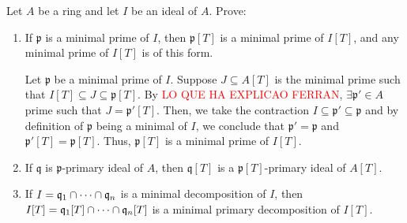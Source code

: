 \begin{problem}
    Let $A$ be a ring and let $I$ be an ideal of $A$.
    Prove:
    \begin{enumerate}[label=(\theproblem.\arabic*),ref=\theproblem.\arabic*]

        \item If $\mathfrak{p}$ is a minimal prime of $I$, then $\mathfrak{p}[T]$ is a minimal prime of $I[T]$, and any minimal prime of $I[T]$ is of this form.
        \begin{sol}
            Let $\mathfrak{p}$ be a minimal prime of $I$.
            Suppose $J \subseteq A[T]$ is the minimal prime such that $I[T] \subseteq J \subseteq \mathfrak{p}[T]$.
            By \textcolor{red}{LO QUE HA EXPLICAO FERRAN}, $\exists \mathfrak{p}' \in A$ prime such that $J = \mathfrak{p}'[T]$.
            Then, we take the contraction $I \subseteq \mathfrak{p}' \subseteq \mathfrak{p}$ and by definition of $\mathfrak{p}$ being a minimal of $I$, we conclude that $\mathfrak{p}' = \mathfrak{p}$ and $\mathfrak{p}'[T] = \mathfrak{p}[T]$.
            Thus, $\mathfrak{p}[T]$ is a minimal prime of $I[T]$.
        \end{sol}

        \item If $\mathfrak{q}$ is $\mathfrak{p}$-primary ideal of $A$, then $\mathfrak{q}[T]$ is a $\mathfrak{p}[T]$-primary ideal of $A[T]$.
        \begin{sol}
        \end{sol}

        \item If $I = \mathfrak{q}_1 \cap \cdots \cap \mathfrak{q}_n$ is a minimal decomposition of $I$, then $I[T] = \mathfrak{q}_1[T] \cap \cdots \cap \mathfrak{q}_n[T]$ is a minimal primary decomposition of $I[T]$.
        \begin{sol}
        \end{sol}

    \end{enumerate}
\end{problem}